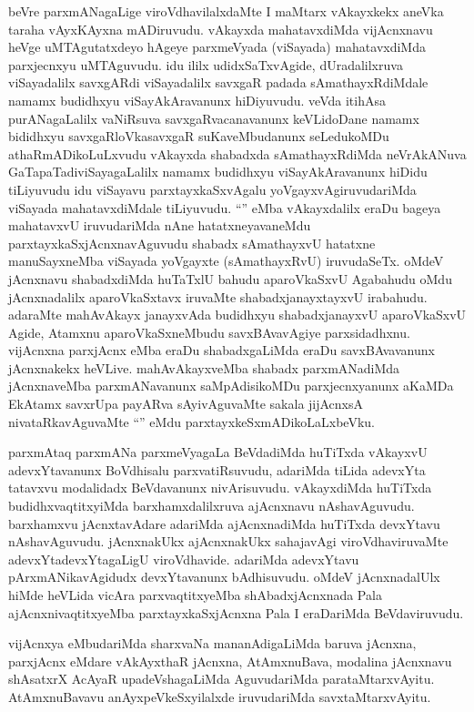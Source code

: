 
\begin{artha}
beVre parxmANagaLige viroVdhavilalxdaMte I maMtarx vAkayxkekx aneVka taraha vAyxKAyxna mADiruvudu. vAkayxda mahatavxdiMda vijAcnxnavu heVge uMTAgutatxdeyo hAgeye parxmeVyada (viSayada) mahatavxdiMda parxjecnxyu uMTAguvudu. idu ililx udidxSaTxvAgide, dUradalilxruva viSayadalilx savxgARdi viSayadalilx savxgaR padada sAmathayxRdiMdale namamx budidhxyu viSayAkAravanunx hiDiyuvudu. veVda itihAsa purANagaLalilx vaNiRsuva savxgaRvacanavanunx keVLidoDane namamx bididhxyu savxgaRloVkasavxgaR suKaveMbudanunx seLedukoMDu athaRmADikoLuLxvudu vAkayxda shabadxda sAmathayxRdiMda neVrAkANuva GaTapaTadiviSayagaLalilx namamx budidhxyu viSayAkAravanunx hiDidu tiLiyuvudu idu viSayavu parxtayxkaSxvAgalu yoVgayxvAgiruvudariMda viSayada mahatavxdiMdale tiLiyuvudu. ``\stext'' eMba vAkayxdalilx eraDu bageya mahatavxvU iruvudariMda nAne hatatxneyavaneMdu parxtayxkaSxjAcnxnavAguvudu shabadx sAmathayxvU hatatxne manuSayxneMba viSayada yoVgayxte (sAmathayxRvU) iruvudaSeTx. oMdeV jAcnxnavu shabadxdiMda huTaTxlU bahudu aparoVkaSxvU Agabahudu oMdu jAcnxnadalilx aparoVkaSxtavx iruvaMte shabadxjanayxtayxvU irabahudu. adaraMte mahAvAkayx janayxvAda budidhxyu shabadxjanayxvU aparoVkaSxvU Agide, Atamxnu aparoVkaSxneMbudu savxBAvavAgiye parxsidadhxnu. vijAcnxna parxjAcnx eMba eraDu shabadxgaLiMda eraDu savxBAvavanunx jAcnxnakekx heVLive. mahAvAkayxveMba shabadx parxmANadiMda jAcnxnaveMba parxmANavanunx saMpAdisikoMDu parxjecnxyanunx aKaMDa EkAtamx savxrUpa payARva sAyivAguvaMte sakala jijAcnxsA nivataRkavAguvaMte  ``\stext'' eMdu parxtayxkeSxmADikoLaLxbeVku.

parxmAtaq parxmANa parxmeVyagaLa BeVdadiMda huTiTxda vAkayxvU adevxYtavanunx BoVdhisalu parxvatiRsuvudu, adariMda tiLida adevxYta tatavxvu modalidadx BeVdavanunx nivArisuvudu. vAkayxdiMda huTiTxda budidhxvaqtitxyiMda barxhamxdalilxruva ajAcnxnavu nAshavAguvudu. barxhamxvu jAcnxtavAdare adariMda ajAcnxnadiMda huTiTxda devxYtavu nAshavAguvudu. jAcnxnakUkx ajAcnxnakUkx sahajavAgi viroVdhaviruvaMte adevxYtadevxYtagaLigU viroVdhavide. adariMda adevxYtavu pArxmANikavAgidudx devxYtavanunx bAdhisuvudu. oMdeV jAcnxnadalUlx hiMde heVLida vicAra parxvaqtitxyeMba shAbadxjAcnxnada Pala ajAcnxnivaqtitxyeMba parxtayxkaSxjAcnxna Pala I eraDariMda BeVdaviruvudu.
\end{artha}


\begin{artha}
vijAcnxya eMbudariMda sharxvaNa mananAdigaLiMda baruva jAcnxna, parxjAcnx eMdare vAkAyxthaR jAcnxna, AtAmxnuBava, modalina jAcnxnavu shAsatxrX AcAyaR upadeVshagaLiMda AguvudariMda parataMtarxvAyitu. AtAmxnuBavavu anAyxpeVkeSxyilalxde iruvudariMda savxtaMtarxvAyitu.
\end{artha}

